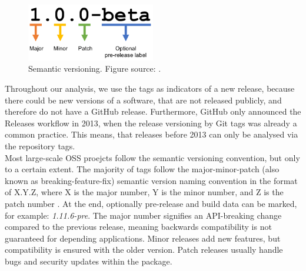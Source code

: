\begin{figure}
    \centering
    \includegraphics[width=0.5\textwidth]{figures/semantic-versioning.png}
    \caption{Semantic versioning. Figure source: \cite{SemanticVersioningUT2018}.}
    \label{fig:semver}
\end{figure}

Throughout our analysis, we use the tags as indicators of a new release, because there could be new versions of a software, that are not released publicly, and therefore do not have a GitHub release. Furthermore, GitHub only announced the Releases workflow in 2013, when the release versioning by Git tags was already a common practice. This means, that releases before 2013 can only be analysed via the repository tags. \\

Most large-scale OSS proejcts follow the semantic versioning convention, but only to a certain extent. The majority of tags follow the major-minor-patch (also known as breaking-feature-fix) semantic version naming convention in the format of X.Y.Z, where X is the major number, Y is the minor number, and Z is the patch number \cite{preston-wernerSemanticVersioning}. At the end, optionally pre-release and build data can be marked, for example: \textit{1.11.6-pre}. The major number signifies an API-breaking change compared to the previous release, meaning backwards compatibility is not guaranteed for depending applications. Minor releases add new features, but compatibility is ensured with the older version. Patch releases usually handle bugs and security updates within the package. \\

